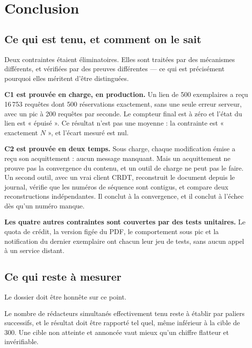 \section{Conclusion}

\subsection{Ce qui est tenu, et comment on le sait}

Deux contraintes étaient éliminatoires. Elles sont traitées par des mécanismes
différents, et vérifiées par des preuves différentes — ce qui est précisément
pourquoi elles méritent d'être distinguées.

\textbf{C1 est prouvée en charge, en production.} Un lien de 500 exemplaires a
reçu 16\,753 requêtes dont 500 réservations exactement, sans une seule erreur
serveur, avec un pic à 200 requêtes par seconde. Le compteur final est à zéro et
l'état du lien est « épuisé ». Ce résultat n'est pas une moyenne : la contrainte
est « exactement $N$ », et l'écart mesuré est nul.

\textbf{C2 est prouvée en deux temps.} Sous charge, chaque modification émise a
reçu son acquittement : aucun message manquant. Mais un acquittement ne prouve
pas la convergence du contenu, et un outil de charge ne peut pas le faire. Un
second outil, avec un vrai client CRDT, reconstruit le document depuis le journal,
vérifie que les numéros de séquence sont contigus, et compare deux
reconstructions indépendantes. Il conclut à la convergence, et il conclut à
l'échec dès qu'un numéro manque.

\textbf{Les quatre autres contraintes sont couvertes par des tests unitaires.}
Le quota de crédit, la version figée du PDF, le comportement sous pic et la
notification du dernier exemplaire ont chacun leur jeu de tests, sans aucun appel
à un service distant.

\subsection{Ce qui reste à mesurer}

Le dossier doit être honnête sur ce point.

Le nombre de rédacteurs simultanés effectivement tenu reste à établir par paliers
successifs, et le résultat doit être rapporté tel quel, même inférieur à la cible
de 300. Une cible non atteinte et annoncée vaut mieux qu'un chiffre flatteur et
invérifiable.

